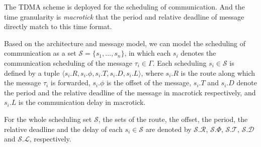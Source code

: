 \documentclass[journal]{IEEEtran}
\newcommand{\calL}{\mathcal{L}}
\newcommand{\calS}{\mathcal{S}}
\newcommand{\calR}{\mathcal{R}}
\newcommand{\calD}{\mathcal{D}}
\newcommand{\calT}{\mathcal{T}}
\theoremstyle{remark}
\begin{document}
The TDMA scheme is deployed for the scheduling of communication.  
And the time granularity is \emph{macrotick} that the period and relative deadline of message directly match to this time format.

Based on the architecture and message model,
 we can model the scheduling of communication as a set $\calS=\{s_1,\ldots,s_n\}$,
  in which each $s_{i}$ denotes the communication scheduling of the message $\tau_{i}\in\Gamma$. 
Each scheduling $s_{i}\in\calS$ is defined by a tuple $\langle s_i.R, s_i.\phi, s_i.T, s_i.D, s_i.L\rangle$,
 where $s_i.R$ is the route along which the message $\tau_i$ is forwarded, 
 $s_i.\phi$ is the offset of the message,
  $s_i.T$ and
   $s_i.D$ denote the period and the relative deadline of the message in macrotick respectively,
    and $s_i.L$ is the communication delay in macrotick.

For the whole scheduling set $\calS$,
 the sets of the route,
 the offset,
  the period,
   the relative deadline and the delay of each $s_i\in\calS$ are denoted by $\calS.\calR$,
  $\calS.\Phi$,
   $\calS.\calT$,
    $\calS.\calD$ and $\calS.\calL$,
     respectively.

\end{document}
